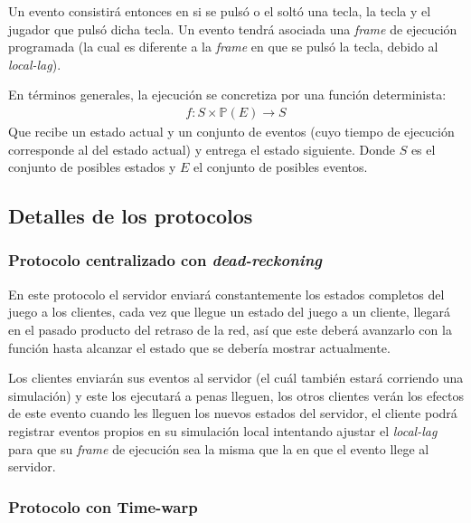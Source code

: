 Un evento consistirá entonces en si se pulsó o el soltó una tecla, la tecla y el jugador que pulsó dicha tecla. Un evento tendrá asociada una \emph{frame} de ejecución programada (la cual es diferente a la \emph{frame} en que se pulsó la tecla, debido al \emph{local-lag}).

En términos generales, la ejecución se concretiza por una función determinista:
\begin{align*}
    f : S \times \mathbb{P}(E) \rightarrow S
\end{align*}
Que recibe un estado actual y un conjunto de eventos (cuyo tiempo de ejecución corresponde al del estado actual) y entrega el estado siguiente. Donde $S$ es el conjunto de posibles estados y $E$ el conjunto de posibles eventos.

\subsection{Detalles de los protocolos}


\subsubsection{Protocolo centralizado con \emph{dead-reckoning}}

En este protocolo el servidor enviará constantemente los estados completos del juego a los clientes, cada vez que llegue un estado del juego a un cliente, llegará en el pasado producto del retraso de la red, así que este deberá avanzarlo con la función hasta alcanzar el estado que se debería mostrar actualmente.

Los clientes enviarán sus eventos al servidor (el cuál también estará corriendo una simulación) y este los ejecutará a penas lleguen, los otros clientes verán los efectos de este evento cuando les lleguen los nuevos estados del servidor, %
el cliente podrá registrar eventos propios en su simulación local intentando ajustar el \emph{local-lag} para que su \emph{frame} de ejecución sea la misma que la en que el evento llege al servidor.

\subsubsection{Protocolo con Time-warp}


